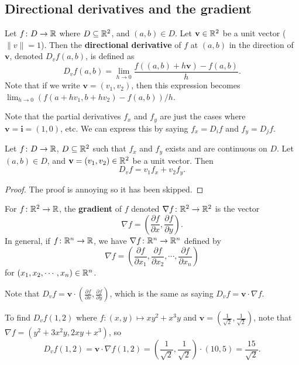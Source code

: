 \subsection{Directional derivatives and the gradient}
\begin{definition}
    Let $f \colon D \to \mathbb{R}$ where $D\subseteq \mathbb{R}^2$, and $(a,b)\in D$. Let $\mathbf v\in \mathbb{R}^2$ be a unit vector ($\|v\|=1$). Then the \textbf{directional derivative} of $f$ at $(a,b)$ in the direction of $\mathbf v$, denoted $D_vf(a,b)$, is defined as \[
        D_vf(a,b)= \lim_{h\to 0} \frac{f((a,b)+h \mathbf v)-f(a,b)}{h}.
    \] Note that if we write $\mathbf v=(v_1,v_2)$, then this expression becomes  $\lim_{h\to 0}(f(a+hv_1,b+hv_2)-f(a,b)) /h$. 
\end{definition} Note that the partial derivatives $f_x$ and $f_y$ are just the cases where $\mathbf v=\mathbf i=(1,0)$, etc. We can express this by saying $f_x= D_i f$ and $f_y=D_j f$.
\begin{theorem}
    Let $f \colon D \to \mathbb{R}$, $D\subseteq \mathbb{R}^2$ such that $f_x$ and $f_y$ exists and are continuous on $D$. Let $(a,b)\in D$, and $\mathbf v=(v_1,v_2)\in \mathbb{R}^2$ be a unit vector. Then \[
        D_v f= v_1 f_x+v_2f_y.
    \] 
\end{theorem}
\begin{proof}
    The proof is annoying so it has been skipped.
\end{proof}
\begin{definition}[Gradient]
   For $f\colon \mathbb{R}^2\to \mathbb{R}$, the \textbf{gradient} of $f$ denoted $\nabla f \colon \mathbb{R}^2 \to \mathbb{R}^2 $ is the vector \[
       \nabla f=\left( \frac{\partial f}{\partial x}, \frac{\partial f}{\partial y} \right) .
   \] In general, if $f\colon \mathbb{R}^n  \to \mathbb{R}$, we have $\nabla f \colon \mathbb{R}^n  \to \mathbb{R}^n $ defined by \[
   \nabla f = \left(  \frac{\partial f}{\partial x_1}, \frac{\partial f}{\partial x_2},\cdots ,\frac{\partial f}{\partial x_n }\right) 
   \] for $(x_1,x_2,\cdots ,x_n )\in \mathbb{R}^n $.
\end{definition}
Note that $D_vf=\mathbf v \cdot \left( \frac{\partial f}{\partial x}, \frac{\partial f}{\partial y} \right) $, which is the same as saying $D_vf=\mathbf v\cdot \nabla f$.
\begin{example}
    To find $D_vf(1,2)$ where $f \colon (x,y)\mapsto xy^2+x^3y$ and $\mathbf v=\left( \frac{1}{\sqrt{2} },\frac{1}{\sqrt{2} } \right) $, note that $\nabla f=(y^2+3x^2y,2xy+x^3)$, so \[
        D_vf(1,2)=\mathbf v \cdot \nabla f(1,2)=\left( \frac{1}{\sqrt{2} },\frac{1}{\sqrt{2} } \right) \cdot (10,5)=\frac{15}{\sqrt{2} }.
    \] 
\end{example}
